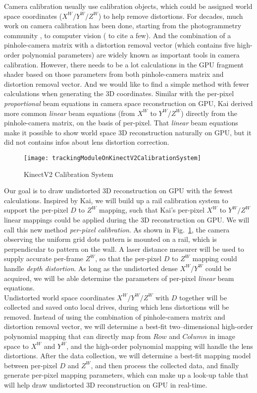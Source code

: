 Camera calibration usually use calibration objects, which could be assigned world space coordinates (\(X^W/Y^W/Z^W\)) to help remove distortions. For decades, much work on camera calibration has been done, starting from the photogrammetry community \cite{photogrammetry01_1971, photogrammetry02_1975}, to computer vision (\cite{Tsai1987, treeDcalibration1_1993, Zhengyou04} to cite a few). And the combination of a pinhole-camera matrix with a distortion removal vector (which contains five high-order polynomial parameters) are widely known as important tools in camera calibration. However, there needs to be a lot calculations in the GPU fragment shader based on those parameters from both pinhole-camera matrix and distortion removal vector. And we would like to find a simple method with fewer calculations when generating the 3D coordinates. Similar with the per-pixel \emph{proportional} beam equations in camera space reconstruction on GPU, Kai \cite{Kai10} derived more common \emph{linear} beam equations (from \(X^W\) to \(Y^W/Z^W\)) directly from the pinhole-camera matrix, on the basis of per-pixel. That \emph{linear} beam equations make it possible to show world space 3D reconstruction naturally on GPU, but it did not contains infos about lens distortion correction. 
\\\indent
%
\begin{figure}[t]
\centering
\texttt{[image: trackingModuleOnKinectV2CalibrationSystem]}
\caption{KinectV2 Calibration System}
\label{trackingModuleOnKinectV2CalibrationSystem}
\end{figure}%
Our goal is to draw undistorted 3D reconstruction on GPU with the fewest calculations. Inspired by Kai, we will build up a rail calibration system to support the per-pixel \(D\) to \(Z^W\) mapping, such that Kai's per-pixel \(X^W\) to \(Y^W/Z^W\) linear mappings could be applied during the 3D reconstruction on GPU. We will call this new method \textit{per-pixel calibration}. As shown in Fig.~\ref{trackingModuleOnKinectV2CalibrationSystem}, the camera observing the uniform grid dots pattern is mounted on a rail, which is perpendicular to pattern on the wall. A laser distance measurer will be used to supply accurate per-frame \(Z^W\), so that the per-pixel \(D\) to \(Z^W\) mapping could handle \emph{depth distortion}. As long as the undistorted dense \(X^W/Y^W\) could be acquired, we will be able determine the parameters of per-pixel \emph{linear} beam equations.
\\\indent
Undistorted world space coordinates \(X^W/Y^W/Z^W\) with \(D\) together will be collected and saved onto local drives, during which lens distortions will be removed. Instead of using the combination of pinhole-camera matrix and distortion removal vector, we will determine a best-fit two--dimensional high-order polynomial mapping that can directly map from \(Row\) and \(Column\) in image space to \(X^W\) and \(Y^W\), and the high-order polynomial mapping will handle the lens distortions. After the data collection, we will determine a best-fit mapping model between per-pixel \(D\) and \(Z^W\), and then process the collected data, and finally generate per-pixel mapping parameters, which can make up a look-up table that will help draw undistorted 3D reconstruction on GPU in real-time.
